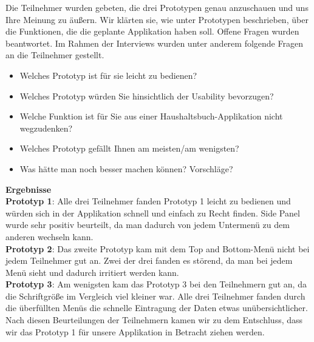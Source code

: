 \documentclass[runningheads,a4paper]{llncs}
\begin{document}
Die Teilnehmer wurden gebeten, die drei Prototypen genau anzuschauen und uns Ihre Meinung zu äußern. Wir  klärten sie, wie unter Prototypen beschrieben, über die Funktionen, die die geplante Applikation haben soll. Offene Fragen wurden beantwortet.  Im Rahmen der Interviews wurden unter anderem folgende Fragen an die Teilnehmer gestellt.

\begin{itemize}
\item	Welches Prototyp ist für sie leicht zu bedienen?
\item	Welches Prototyp würden Sie hinsichtlich der Usability bevorzugen?
\item	Welche Funktion ist für Sie aus einer Haushaltsbuch-Applikation nicht wegzudenken?
\item	Welches Prototyp gefällt Ihnen am meisten/am wenigsten?
\item	Was hätte man noch besser machen können? Vorschläge?
\end {itemize}

\textbf {Ergebnisse}\\

\textbf {Prototyp 1}: Alle drei Teilnehmer fanden Prototyp 1 leicht zu bedienen und würden sich in der Applikation schnell und einfach zu Recht finden. Side Panel wurde sehr positiv beurteilt, da man dadurch von jedem Untermenü zu dem anderen wechseln kann. \\

\textbf {Prototyp 2}: Das zweite Prototyp kam mit dem Top and Bottom-Menü nicht bei jedem Teilnehmer gut an. Zwei der drei fanden es störend, da man bei jedem Menü sieht und dadurch irritiert werden kann. \\

\textbf {Prototyp 3}: Am wenigsten kam das Prototyp 3 bei den Teilnehmern gut an, da die Schriftgröße im Vergleich viel kleiner war. Alle drei Teilnehmer fanden durch die überfüllten Menüs die schnelle Eintragung der Daten etwas unübersichtlicher.\\

Nach diesen Beurteilungen der Teilnehmern kamen wir zu dem Entschluss, dass wir das Prototyp 1 für unsere Applikation in Betracht ziehen werden. 


\clearpage
\end{document}
